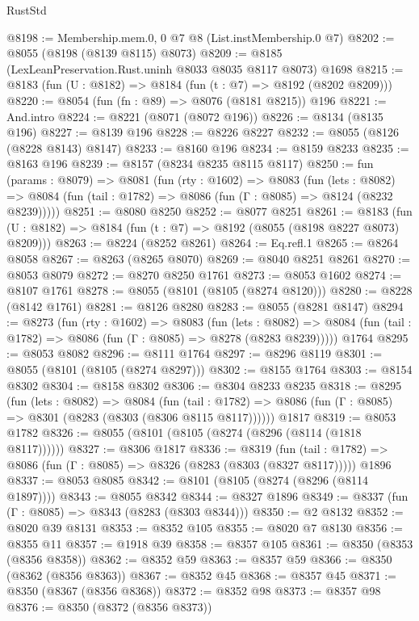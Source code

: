 \begin{lexlean}{RustStd}
\begin{coremodule}
@8198 := Membership.mem.{0, 0} @7 @8 (List.instMembership.{0} @7)
@8202 := @8055 (@8198 (@8139 @8115) @8073)
@8209 := @8185 (LexLeanPreservation.Rust.uninh @8033 @8035 @8117 @8073) @1698
@8215 := @8183 (fun (U : @8182) => @8184 (fun (t : @7) => @8192 (@8202 @8209)))
@8220 := @8054 (fun (fn : @89) => @8076 (@8181 @8215)) @196
@8221 := And.intro
@8224 := @8221 (@8071 (@8072 @196))
@8226 := @8134 (@8135 @196)
@8227 := @8139 @196
@8228 := @8226 @8227
@8232 := @8055 (@8126 (@8228 @8143) @8147)
@8233 := @8160 @196
@8234 := @8159 @8233
@8235 := @8163 @196
@8239 := @8157 (@8234 @8235 @8115 @8117)
@8250 := fun (params : @8079) =>
  @8081
    (fun (rty : @1602) =>
    @8083
      (fun (lets : @8082) =>
      @8084 (fun (tail : @1782) => @8086 (fun (Γ : @8085) => @8124 (@8232 @8239)))))
@8251 := @8080 @8250
@8252 := @8077 @8251
@8261 := @8183 (fun (U : @8182) => @8184 (fun (t : @7) => @8192 (@8055 (@8198 @8227 @8073) @8209)))
@8263 := @8224 (@8252 @8261)
@8264 := Eq.refl.{1}
@8265 := @8264 @8058
@8267 := @8263 (@8265 @8070)
@8269 := @8040 @8251 @8261
@8270 := @8053 @8079
@8272 := @8270 @8250 @1761
@8273 := @8053 @1602
@8274 := @8107 @1761
@8278 := @8055 (@8101 (@8105 (@8274 @8120)))
@8280 := @8228 (@8142 @1761)
@8281 := @8126 @8280
@8283 := @8055 (@8281 @8147)
@8294 := @8273
    (fun (rty : @1602) =>
    @8083
      (fun (lets : @8082) =>
      @8084 (fun (tail : @1782) => @8086 (fun (Γ : @8085) => @8278 (@8283 @8239)))))
    @1764
@8295 := @8053 @8082
@8296 := @8111 @1764
@8297 := @8296 @8119
@8301 := @8055 (@8101 (@8105 (@8274 @8297)))
@8302 := @8155 @1764
@8303 := @8154 @8302
@8304 := @8158 @8302
@8306 := @8304 @8233 @8235
@8318 := @8295
    (fun (lets : @8082) =>
    @8084
      (fun (tail : @1782) => @8086 (fun (Γ : @8085) => @8301 (@8283 (@8303 (@8306 @8115 @8117))))))
    @1817
@8319 := @8053 @1782
@8326 := @8055 (@8101 (@8105 (@8274 (@8296 (@8114 (@1818 @8117))))))
@8327 := @8306 @1817
@8336 := @8319
    (fun (tail : @1782) => @8086 (fun (Γ : @8085) => @8326 (@8283 (@8303 (@8327 @8117)))))
    @1896
@8337 := @8053 @8085
@8342 := @8101 (@8105 (@8274 (@8296 (@8114 @1897))))
@8343 := @8055 @8342
@8344 := @8327 @1896
@8349 := @8337 (fun (Γ : @8085) => @8343 (@8283 (@8303 @8344)))
@8350 := @2 @8132
@8352 := @8020 @39 @8131
@8353 := @8352 @105
@8355 := @8020 @7 @8130
@8356 := @8355 @11
@8357 := @1918 @39
@8358 := @8357 @105
@8361 := @8350 (@8353 (@8356 @8358))
@8362 := @8352 @59
@8363 := @8357 @59
@8366 := @8350 (@8362 (@8356 @8363))
@8367 := @8352 @45
@8368 := @8357 @45
@8371 := @8350 (@8367 (@8356 @8368))
@8372 := @8352 @98
@8373 := @8357 @98
@8376 := @8350 (@8372 (@8356 @8373))

\end{coremodule}
\end{lexlean}
